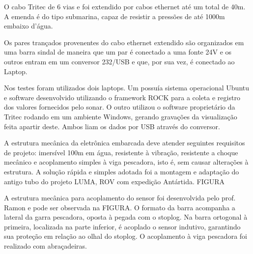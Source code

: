 O cabo Tritec de 6 vias e foi extendido por cabos ethernet até um total de 40m.
A emenda é do tipo submarina, capaz de re\-sistir a pressões de até 1000m
embaixo d'água.

Os pares trançados provenentes do cabo ethernet extendido são organizados em uma
barra sindal de maneira que um par é conectado a uma fonte 24V e os outros
entram em um conversor 232/USB e que, por sua vez, é conectado ao Laptop.

Nos testes foram utilizados dois laptops. Um possuía sistema operacional Ubuntu
e software desenvolvido utilizando o framework ROCK para a coleta e registro dos
valores fornecidos pelo sonar. O outro utilizou o software proprietário da
Tritec rodando em um ambiente Windows, gerando gravações da visualização feita
apartir deste. Ambos liam os dados por USB através do conversor.


A estrutura mecânica da eletrônica embarcada deve atender seguintes requisitos
de projeto: imersível 100m em água, resistente à vibração, resistente a choque
mecânico e acoplamento simples à viga pescadora, isto é, sem causar alterações à
estrutura. A solução rápida e simples adotada foi a montagem e adaptação do
antigo tubo do projeto LUMA, ROV com expedição Antártida. FIGURA

A estrutura mecânica para acoplamento do sensor foi desenvolvida pelo prof.
Ramon e pode ser observada na FIGURA. O formato da barra acompanha a lateral
da garra pescadora, oposta à pegada com o stoplog. Na barra ortogonal à
primeira, localizada na parte inferior, é acoplado o sensor indutivo, garantindo
sua proteção em relação ao olhal do stoplog. O acoplamento à viga pescadora foi
realizado com abraçadeiras.




